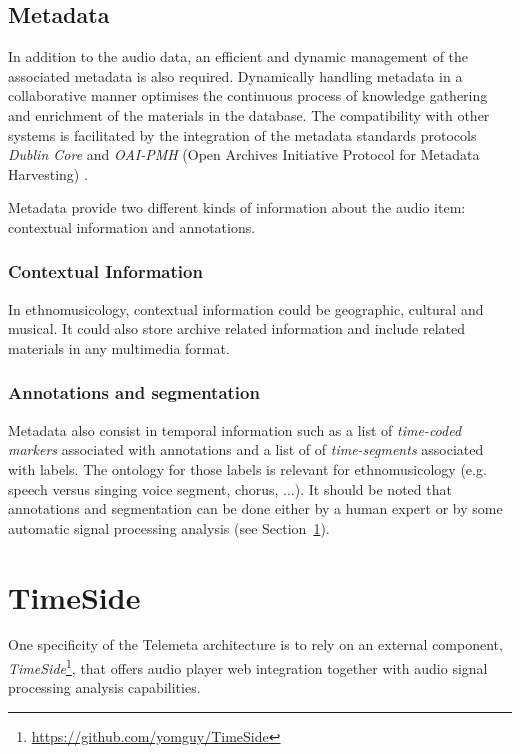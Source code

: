 \documentclass{paper}
\begin{document}
\subsection{Metadata}\label{sec:metadata}
In addition to the audio data, an efficient and dynamic management of the associated metadata is also required. %
Dynamically handling metadata in a collaborative manner optimises the continuous process of knowledge gathering and enrichment of the materials in the database.  
The compatibility with other systems is facilitated by the integration of the metadata standards protocols \emph{Dublin Core} and \emph{OAI-PMH} (Open Archives Initiative Protocol for Metadata Harvesting) \cite{DublinCore,OAI-PMH}.

Metadata provide two different kinds of information about the audio item: contextual information and annotations.


\subsubsection{Contextual Information}
In ethnomusicology, contextual information could be geographic, cultural and musical. It could also store archive related information and include related materials in any multimedia format.

\subsubsection{Annotations and segmentation}
Metadata also consist in temporal information such as a list of \emph{time-coded markers} associated with annotations and a list of of \emph{time-segments} associated with labels. The ontology for those labels is relevant for ethnomusicology (e.g. speech versus singing voice segment, chorus, ...).
It should be noted that annotations and segmentation can be done either by a human expert or by some automatic signal processing analysis (see Section~\ref{sec:Timeside}).

\section{TimeSide}\label{sec:Timeside}
One specificity of the Telemeta architecture is to rely on an external component, \emph{TimeSide}\footnote{\url{https://github.com/yomguy/TimeSide}}, that offers audio player web integration together with audio signal processing analysis capabilities. 
\end{document}
